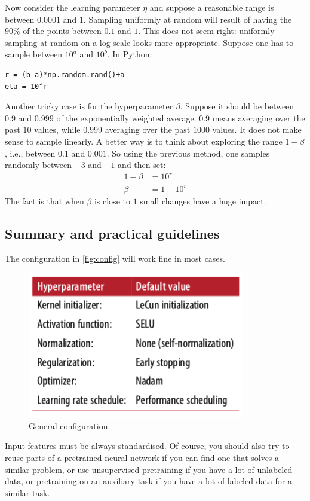 Now consider the learning parameter $\eta$ and suppose a reasonable range is between $0.0001$ and $1$. Sampling uniformly at random will result of having the $90\%$ of the points between $0.1$ and $1$. This does not seem right: uniformly sampling at random on a log-scale looks more appropriate. Suppose one has to sample between $10^a$ and $10^b$. In Python:
\begin{lstlisting}
r = (b-a)*np.random.rand()+a
eta = 10^r
\end{lstlisting}

Another tricky case is for the hyperparameter $\beta$. Suppose it should be between $0.9$ and $0.999$ of the exponentially weighted average. $0.9$ means averaging over the past $10$ values, while $0.999$ averaging over the past $1000$ values. It does not make sense to sample linearly. A better way is to think about exploring the range $1-\beta$, i.e., between $0.1$ and $0.001$. So using the previous method, one samples randomly between $-3$ and $-1$ and then set:
\begin{equation}
\begin{aligned}
1-\beta &= 10^r\\
\beta &= 1 - 10^r
\end{aligned}
\end{equation}
The fact is that when $\beta$ is close to $1$ small changes have a huge impact.

\subsection{Summary and practical guidelines}
The configuration in \autoref{fig:config} will work fine in most cases.
\begin{figure}
\centering
\includegraphics[scale=0.6]{img/config}
\caption{General configuration.}
\label{fig:config}
\end{figure}
Input features must be always standardised. Of course, you should also try to reuse parts of a pretrained neural network if you can find one that solves a similar problem, or use unsupervised pretraining if you have a lot of unlabeled data, or pretraining on an auxiliary task if you have a lot of labeled data for a similar task.

